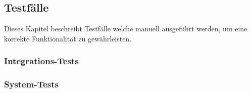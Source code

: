     \clearpage
    \subsection{Testfälle}
    Dieses Kapitel beschreibt Testfälle welche manuell ausgeführt werden, um eine korrekte Funktionalität zu gewährleisten.
    	\subsubsection{Integrations-Tests}
            
        \subsubsection{System-Tests}    
            

        \clearpage

